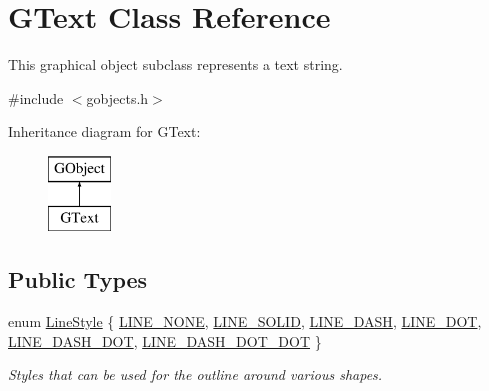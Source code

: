 \hypertarget{classGText}{}\section{G\+Text Class Reference}
\label{classGText}


This graphical object subclass represents a text string.  




{\ttfamily \#include $<$gobjects.\+h$>$}

Inheritance diagram for G\+Text\+:\begin{figure}[H]
\begin{center}
\leavevmode
\includegraphics[height=2.000000cm]{classGText}
\end{center}
\end{figure}
\subsection*{Public Types}
\begin{DoxyCompactItemize}
\item 
enum \mbox{\hyperlink{classGObject_a86e0f5648542856159bb40775c854aa7}{Line\+Style}} \{ \mbox{\hyperlink{classGObject_a86e0f5648542856159bb40775c854aa7acbc84bd5232621834ed31f44d457c1eb}{L\+I\+N\+E\+\_\+\+N\+O\+NE}}, 
\mbox{\hyperlink{classGObject_a86e0f5648542856159bb40775c854aa7a700c78bc2cd76acaab26651bf7b4941f}{L\+I\+N\+E\+\_\+\+S\+O\+L\+ID}}, 
\mbox{\hyperlink{classGObject_a86e0f5648542856159bb40775c854aa7a9ccba0845f785d81d07b333ae1aad84e}{L\+I\+N\+E\+\_\+\+D\+A\+SH}}, 
\mbox{\hyperlink{classGObject_a86e0f5648542856159bb40775c854aa7a8e811c096cb941997f0bfda168bb6df3}{L\+I\+N\+E\+\_\+\+D\+OT}}, 
\mbox{\hyperlink{classGObject_a86e0f5648542856159bb40775c854aa7ada15a2e3d737b2db7706d8300f91b89d}{L\+I\+N\+E\+\_\+\+D\+A\+S\+H\+\_\+\+D\+OT}}, 
\mbox{\hyperlink{classGObject_a86e0f5648542856159bb40775c854aa7aabf4053a73eafa7ba2b7e6d664c74c1d}{L\+I\+N\+E\+\_\+\+D\+A\+S\+H\+\_\+\+D\+O\+T\+\_\+\+D\+OT}}
 \}
\begin{DoxyCompactList}\small\item\em Styles that can be used for the outline around various shapes. \end{DoxyCompactList}\end{DoxyCompactItemize}
